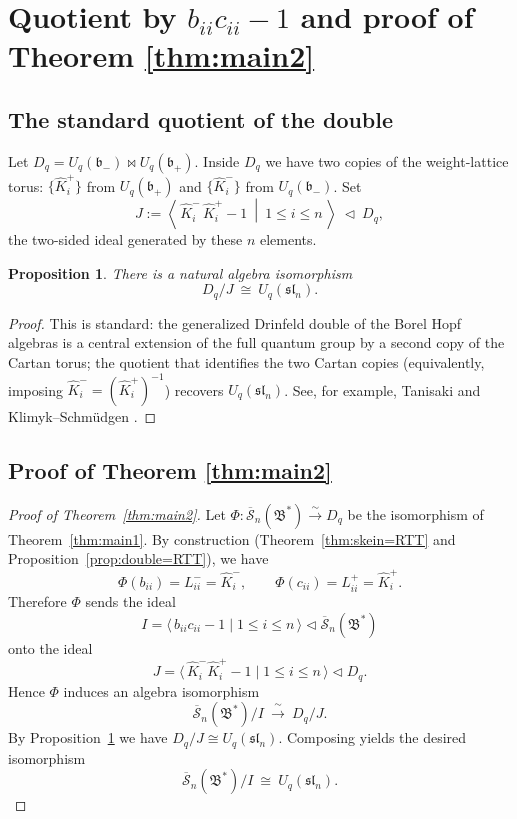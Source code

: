 \documentclass[11pt]{article}
\newcommand{\Uc}{U}
\newcommand{\sl}{\mathfrak{sl}}
\newcommand{\fb}{\mathfrak{b}}
\newcommand{\fB}{\mathfrak{B}}
\newcommand{\bcS}{\overline{\mathcal S}}
\newcommand{\bipr}{\bowtie}
\theoremstyle{plain}
\newtheorem{proposition}[theorem]{Proposition}
\theoremstyle{definition}
\begin{document}
\section{Quotient by $b_{ii}c_{ii}-1$ and proof of Theorem \ref{thm:main2}}

\subsection{The standard quotient of the double}

Let $D_q=\Uc_q(\fb_-)\bipr \Uc_q(\fb_+)$.
Inside $D_q$ we have two copies of the weight-lattice torus:
$\{\hat K_i^+\}$ from $\Uc_q(\fb_+)$ and $\{\hat K_i^-\}$ from $\Uc_q(\fb_-)$.
Set
\[
J:=\left\langle\, \hat K_i^-\,\hat K_i^+ -1\ \middle|\ 1\le i\le n\,\right\rangle \ \lhd\ D_q,
\]
the two-sided ideal generated by these $n$ elements.

\begin{proposition}\label{prop:double-quotient}
There is a natural algebra isomorphism
\[
D_q/J\ \cong\ \Uc_q(\sl_n).
\]
\end{proposition}

\begin{proof}
This is standard: the generalized Drinfeld double of the Borel Hopf algebras is a central extension of the full quantum group by a second copy of the Cartan torus; the quotient that identifies the two Cartan copies (equivalently, imposing $\hat K_i^-=(\hat K_i^+)^{-1}$) recovers $\Uc_q(\sl_n)$. See, for example, Tanisaki \cite{Tanisaki} and Klimyk--Schm\"udgen \cite[\S9.2--\S9.4]{KS}.
\end{proof}

\subsection{Proof of Theorem \ref{thm:main2}}

\begin{proof}[Proof of Theorem~\ref{thm:main2}]
Let $\Phi:\bcS_n(\fB^*)\xrightarrow{\sim}D_q$ be the isomorphism of Theorem~\ref{thm:main1}.
By construction (Theorem~\ref{thm:skein=RTT} and Proposition~\ref{prop:double=RTT}), we have
\[
\Phi(b_{ii})=L^-_{ii}=\hat K_i^-,\qquad
\Phi(c_{ii})=L^+_{ii}=\hat K_i^+.
\]
Therefore $\Phi$ sends the ideal
\[
I=\langle\, b_{ii}c_{ii}-1\mid 1\le i\le n\,\rangle\lhd \bcS_n(\fB^*)
\]
onto the ideal
\[
J=\langle\, \hat K_i^- \hat K_i^+ -1\mid 1\le i\le n\,\rangle\lhd D_q.
\]
Hence $\Phi$ induces an algebra isomorphism
\[
\bcS_n(\fB^*)/I\ \xrightarrow{\ \sim\ }\ D_q/J.
\]
By Proposition~\ref{prop:double-quotient} we have $D_q/J\cong \Uc_q(\sl_n)$.
Composing yields the desired isomorphism
\[
\bcS_n(\fB^*)/I\ \cong\ \Uc_q(\sl_n).
\]
\end{proof}
\end{document}
